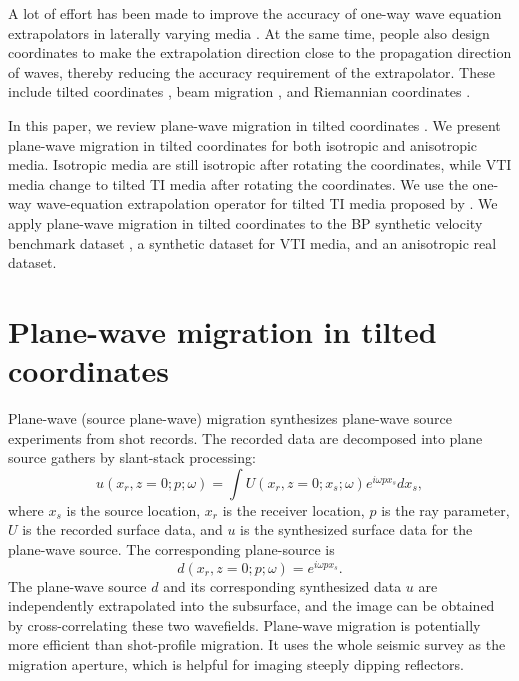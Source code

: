\par
A lot of effort has been made to improve the accuracy of one-way wave equation 
extrapolators in laterally varying media \cite{GEO50-10-16341637,GEO59-12-18821893, dehoop.jmathphys.96,SEG-1996-0415}. At the same time, 
people also design coordinates to make the extrapolation direction close to the 
propagation direction of waves, thereby reducing the accuracy requirement of the extrapolator. 
These include tilted coordinates \cite{GEO50-11-17841796, Etgen-SEG02}, 
beam migration \cite{BDEtgen-SEG03}, 
and Riemannian coordinates \cite{rieman}. 

\par
In this paper, we review plane-wave migration in tilted coordinates 
\cite{SEG2004sgj}. We present plane-wave migration in tilted coordinates for both isotropic and anisotropic media. Isotropic media are still isotropic after rotating the coordinates, while 
VTI media change to tilted TI media after rotating the coordinates. We use the one-way wave-equation
extrapolation operator for tilted TI media proposed by .
We apply plane-wave migration in tilted coordinates to the BP synthetic velocity benchmark dataset \cite{bpdata},
a synthetic dataset for VTI media, and an anisotropic real dataset.


\section{Plane-wave migration in tilted coordinates}
Plane-wave (source plane-wave) migration 
\cite{whitmorephd,Rietveldphd,SEG-2001-10331036, SEG-2002-11561159, zhangyudelayshot}
 synthesizes plane-wave source experiments from shot records. The recorded data are 
decomposed into plane source gathers by slant-stack processing:
\begin{equation}
 u(x_r,z=0;p;\omega)=\int U(x_r,z=0;x_s;\omega)e^{i\omega px_s}dx_s,
\end{equation}
where $x_s$ is the source location, $x_r$ is the receiver location, $p$ is the ray parameter,
$U$ is the recorded surface data, and $u$ is the synthesized surface data for the plane-wave source. The corresponding
plane-source is 
\begin{equation}
  d(x_r,z=0;p;\omega)=e^{i\omega p x_s}.
\end{equation}
The plane-wave source $d$ and its corresponding synthesized data $u$ are independently extrapolated into the 
subsurface, and the image can be obtained by cross-correlating these two wavefields. 
Plane-wave migration is potentially more efficient than shot-profile migration. 
It uses the whole seismic survey as the migration aperture, which is helpful for imaging 
steeply dipping reflectors. 

